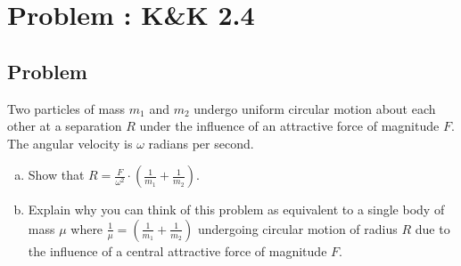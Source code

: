 \documentclass[solutions]{esg8012pset}
\begin{document}
\section{Problem \thesection: K\&K 2.4}
\subsection{Problem}
  Two particles of mass $m_1$ and $m_2$ undergo uniform circular motion about each other at a separation $R$ under the influence of an attractive force of magnitude $F$.  The angular velocity is $\omega$ radians per second.
  \begin{enumerate}[a)]
    \item Show that $R = \frac{F}{\omega^2} \cdot \left(\frac{1}{m_1} + \frac{1}{m_2}\right)$.
    \item Explain why you can think of this problem as equivalent to a single body of mass $\mu$ where $\frac{1}{\mu} = \left(\frac{1}{m_1} + \frac{1}{m_2}\right)$ undergoing circular motion of radius $R$ due to the influence of a central attractive force of magnitude $F$.
  \end{enumerate}
\end{document}
